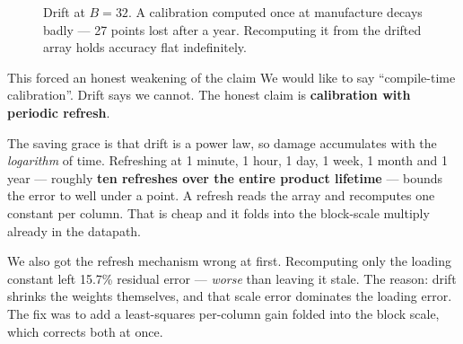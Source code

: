 \documentclass[11pt,a4paper]{report}
\begin{document}
\begin{figure}[h]
\centering
{}
\caption{Drift at $B=32$. A calibration computed once at manufacture decays
badly --- 27 points lost after a year. Recomputing it from the drifted array
holds accuracy flat indefinitely.}
\end{figure}

\begin{warnbox}{This forced an honest weakening of the claim}
We would like to say ``compile-time calibration''. Drift says we cannot. The
honest claim is \textbf{calibration with periodic refresh}.

The saving grace is that drift is a power law, so damage accumulates with the
\emph{logarithm} of time. Refreshing at 1 minute, 1 hour, 1 day, 1 week, 1
month and 1 year --- roughly \textbf{ten refreshes over the entire product
lifetime} --- bounds the error to well under a point. A refresh reads the
array and recomputes one constant per column. That is cheap and it folds into
the block-scale multiply already in the datapath.

We also got the refresh mechanism wrong at first. Recomputing only the loading
constant left 15.7\% residual error --- \emph{worse} than leaving it stale.
The reason: drift shrinks the weights themselves, and that scale error
dominates the loading error. The fix was to add a least-squares per-column
gain folded into the block scale, which corrects both at once.
\end{warnbox}
\end{document}
